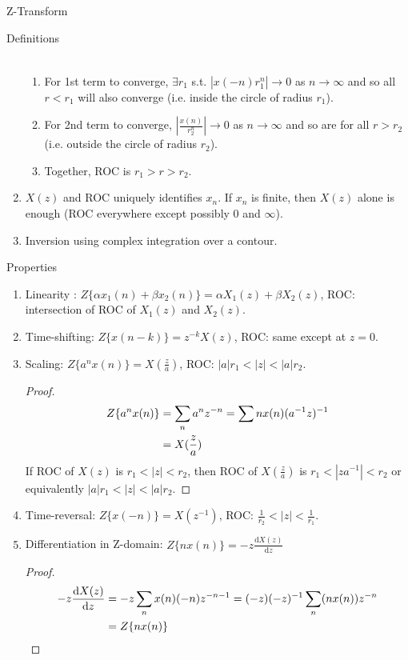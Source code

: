 \documentclass{article}
\begin{document}
\begin{section}{Z-Transform}
\begin{subsection}{Definitions}
\begin{enumerate}
\begin{align}
  \end{align}
  \begin{enumerate}
  \item For 1st term to converge, $\exists r_{1}$ s.t. $|x(-n) r_{1}^{n}|
   \to 0$ as $n \to \infty$ and so all $r < r_{1}$ will also converge
   (i.e. inside the circle of radius $r_{1}$).
  \item For 2nd term to converge, $\left|\frac{x(n)}{r_{2}^{n}}\right| \to 0$
   as $n \to \infty$ and so are for all $r > r_{2}$ (i.e. outside the circle
   of radius $r_{2}$).
  \item Together, ROC is $r_{1} > r > r_{2}$.
  \end{enumerate}
\item $X(z)$ and ROC uniquely identifies $x_{n}$. If $x_{n}$ is finite,
then $X(z)$ alone is enough (ROC everywhere except possibly 0 and $\infty$).
\item Inversion using complex integration over a contour.
\end{enumerate}
\end{subsection}

\begin{subsection}{Properties}
\begin{enumerate}
\item Linearity : $Z\{\alpha x_{1}(n) + \beta x_{2}(n)\} = 
  \alpha X_{1}(z) + \beta X_{2}(z)$, ROC: intersection of ROC of
  $X_{1}(z)$ and $X_{2}(z)$.
\item Time-shifting: $Z\{x(n-k)\} = z^{-k} X(z)$, ROC: same except at $z=0$.
\item Scaling: $Z\{a^{n} x(n)\} = X(\frac{z}{a})$, ROC: 
  $|a|r_{1} < |z| < |a|r_{2}$.
  \begin{proof}
  \begin{align}
  Z\{a^{n}x(n)\} &= \sum_{n} a^{n}z^{-n} = \sum{n} x(n) (a^{-1}z)^{-1}\notag\\
    &= X(\frac{z}{a}) \notag
  \end{align}
  \noindent If ROC of $X(z)$ is $r_{1} < |z| < r_{2}$, then ROC of 
  $X(\frac{z}{a})$ is $r_{1} < |za^{-1}| < r_{2}$ or equivalently 
  $|a|r_{1} < |z| < |a|r_{2}$.
  \end{proof}
\item Time-reversal: $Z\{x(-n)\} = X(z^{-1})$, ROC: $\frac{1}{r_{2}} < |z| <
  \frac{1}{r_{1}}$.
\item Differentiation in Z-domain: $Z\{n x(n)\} = -z 
  \frac{\text{d} X(z)}{\text{d}z}$
  \begin{proof}
  \begin{align}
  -z \frac{\text{d}X(z)}{\text{d}z} &= -z \sum_{n} x(n) (-n)z^{-n-1} 
    = (-z) (-z)^{-1} \sum_{n} (n x(n)) z^{-n} \notag\\
    &= Z\{n x(n)\} \notag
  \end{align}
  

\end{proof}
\end{enumerate}
\end{subsection}
\end{section}
\end{document}
